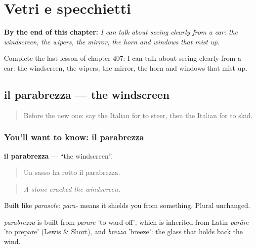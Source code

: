 
\chapter{Vetri e specchietti}
\label{ch:it-vetri-e-specchietti}

\begin{chapteropening}
\textbf{By the end of this chapter:} \emph{I can talk about seeing clearly from a car: the windscreen, the wipers, the mirror, the horn and windows that mist up.}

Complete the last lesson of chapter 407: I can talk about seeing clearly from a car: the windscreen, the wipers, the mirror, the horn and windows that mist up.
\end{chapteropening}

\section[il parabrezza]{il parabrezza — the windscreen}

\label{lesson:IT-C407-parabrezza}



\begin{quote}
Before the new one: say the Italian for to steer, then the Italian for to skid.
\end{quote}

\subsection*{You'll want to know: il parabrezza}
\textbf{il parabrezza} — \textquotedblleft{}the windscreen\textquotedblright{}.

\begin{quote}
Un sasso ha rotto il parabrezza.
\end{quote}

\begin{quote}
\emph{A stone cracked the windscreen.}
\end{quote}

Built like \emph{parasole}: \emph{para-} means it shields you from something. Plural unchanged.

\begin{cousinweb}
\emph{parabrezza} is built from \emph{parare} 'to ward off', which is inherited from Latin \emph{parāre} 'to prepare' (Lewis \& Short), and \emph{brezza} 'breeze': the glass that holds back the wind.
\end{cousinweb}

